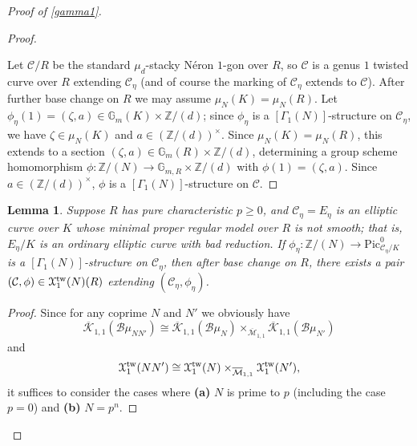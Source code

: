 \documentclass[11pt]{amsart}
\newtheorem{lemma}[subsection]{Lemma}
\theoremstyle{definition}
\begin{document}
\begin{proof}[Proof of \ref{gamma1}]
\begin{proof}
\begin{center}
\end{center}
Let ${\mathcal{C}}/R$ be the standard $\mu_d$-stacky N\'eron $1$-gon over $R$, so ${\mathcal{C}}$ is a genus $1$ twisted curve over $R$ extending ${\mathcal{C}}_\eta$ (and of course the marking of ${\mathcal{C}}_\eta$ extends to ${\mathcal{C}}$). After further base change on $R$ we may assume $\mu_N(K) = \mu_N(R)$. Let $\phi_\eta(1) = (\zeta,a) \in \mathbb{G}_m(K) \times \mathbb{Z}/(d)$; since $\phi_\eta$ is a $[\Gamma_1(N)]$-structure on ${\mathcal{C}}_\eta$, we have $\zeta \in \mu_N(K)$ and $a \in (\mathbb{Z}/(d))^\times$. Since $\mu_N(K) = \mu_N(R)$, this extends to a section $(\zeta,a) \in \mathbb{G}_m(R) \times \mathbb{Z}/(d)$, determining a group scheme homomorphism $\phi: \mathbb{Z}/(N) \rightarrow \mathbb{G}_{m,R} \times \mathbb{Z}/(d)$ with $\phi(1) = (\zeta,a)$. Since $a \in (\mathbb{Z}/(d))^\times$, $\phi$ is a $[\Gamma_1(N)]$-structure on ${\mathcal{C}}$.
\end{proof}

\begin{lemma}\label{purechar}
Suppose $R$ has pure characteristic $p \geq 0$, and ${\mathcal{C}}_\eta = E_\eta$ is an elliptic curve over $K$ whose minimal proper regular model over $R$ is not smooth; that is, $E_\eta/K$ is an ordinary elliptic curve with bad reduction. If $\phi_\eta: \mathbb{Z}/(N) \rightarrow \mathrm{Pic}^0_{{\mathcal{C}}_\eta/K}$ is a $[\Gamma_1(N)]$-structure on ${\mathcal{C}}_\eta$, then after base change on $R$, there exists a pair $({\mathcal{C}},\phi) \in {\mathbf{\EuScript{X}}}^{\mathrm{tw}}_1(N)(R)$ extending $({\mathcal{C}}_\eta,\phi_\eta)$.
\end{lemma}
\begin{proof}
Since for any coprime $N$ and $N'$ we obviously have 
\begin{displaymath}
\overline{\mathcal{K}}_{1,1}({\mathcal{B}}\mu_{NN'}) \cong \overline{\mathcal{K}}_{1,1}({\mathcal{B}}\mu_N) \times_{\overline{\mathcal{M}}_{1,1}} \overline{\mathcal{K}}_{1,1}({\mathcal{B}}\mu_{N'})
\end{displaymath}
and 
\begin{displaymath}
{\mathbf{\EuScript{X}}}^{\mathrm{tw}}_1(NN') \cong {\mathbf{\EuScript{X}}}^{\mathrm{tw}}_1(N) \times_{\overline{\mathcal{M}}_{1,1}} {\mathbf{\EuScript{X}}}^{\mathrm{tw}}_1(N'),
\end{displaymath}
it suffices to consider the cases where \textbf{(a)} $N$ is prime to $p$ (including the case $p=0$) and \textbf{(b)} $N = p^n$.


\end{proof}
\end{proof}
\end{document}
